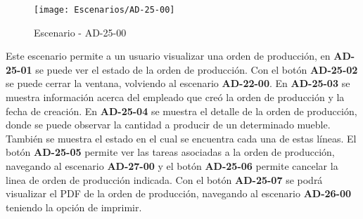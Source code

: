 \begin{figure}[H]
\centering
\texttt{[image: Escenarios/AD-25-00]}
\caption{Escenario - AD-25-00}
\label{fig:AD-25-00}
\end{figure}

Este escenario permite a un usuario visualizar una orden de producción, en \textbf{AD-25-01} se puede ver el estado de la orden de producción. Con el botón \textbf{AD-25-02} se puede cerrar la ventana, volviendo al escenario \textbf{AD-22-00}. En \textbf{AD-25-03} se muestra información acerca del empleado que creó la orden de producción y la fecha de creación. En \textbf{AD-25-04} se muestra el detalle de la orden de producción, donde se puede observar la cantidad a producir de un determinado mueble. También se muestra el estado en el cual se encuentra cada una de estas líneas. El botón \textbf{AD-25-05} permite ver las tareas asociadas a la orden de producción, navegando al escenario \textbf{AD-27-00} y el botón \textbf{AD-25-06} permite cancelar la linea de orden de producción indicada. Con el botón \textbf{AD-25-07} se podrá visualizar el PDF de la orden de producción, navegando al escenario \textbf{AD-26-00} teniendo la opción de imprimir.
\clearpage
